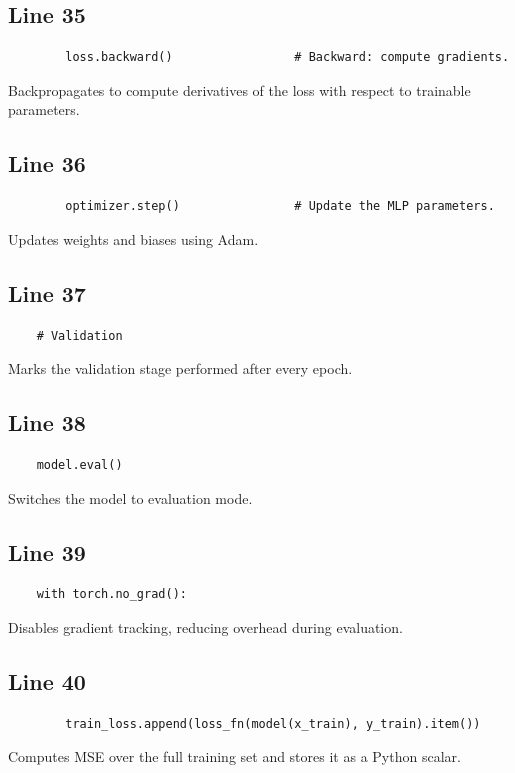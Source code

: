\documentclass[11pt,a4paper]{article}
\begin{document}
\subsection*{Line 35}
\begin{lstlisting}
        loss.backward()                 # Backward: compute gradients.
\end{lstlisting}
Backpropagates to compute derivatives of the loss with respect to trainable parameters.

\subsection*{Line 36}
\begin{lstlisting}
        optimizer.step()                # Update the MLP parameters.
\end{lstlisting}
Updates weights and biases using Adam.

\subsection*{Line 37}
\begin{lstlisting}
    # Validation
\end{lstlisting}
Marks the validation stage performed after every epoch.

\subsection*{Line 38}
\begin{lstlisting}
    model.eval()
\end{lstlisting}
Switches the model to evaluation mode.

\subsection*{Line 39}
\begin{lstlisting}
    with torch.no_grad():
\end{lstlisting}
Disables gradient tracking, reducing overhead during evaluation.

\subsection*{Line 40}
\begin{lstlisting}
        train_loss.append(loss_fn(model(x_train), y_train).item())
\end{lstlisting}
Computes MSE over the full training set and stores it as a Python scalar.
\end{document}

